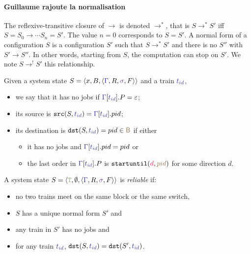\documentclass[runningheads]{llncs}
\newcommand{\tuple}[1]{\ensuremath{\langle #1\rangle}}
\newcommand{\dirFmt}[1]{{\color{dircolor} #1}}
\newcommand{\posFmt}[1]{{\color{poscolor}{#1}}}
\newcommand{\blocks}{{\posFmt{\mathsf{B}}}}
\newcommand{\swFmt}[1]{{\color{swcolor}{#1}}}
\newcommand{\switches}{\ensuremath{\swFmt{\sigma}}}
\newcommand{\trainFmt}[1]{{\color{traincolor} #1}}
\newcommand{\trainSeq}{\trainFmt{\Gamma\xspace}}
\newcommand{\tid}[1]{\ensuremath{\trainFmt{t_{#1}}}}
\newcommand{\su}[2]{{\mbox{$\mathtt{startuntil}(\dirFmt{#1}, \posFmt{#2})$}}\xspace}
\newcommand{\emptyTrainProg}{\varepsilon}
\newcommand{\regulator}{\ensuremath{R}}
\newcommand{\signals}{\ensuremath{F}}
\newcommand{\stateTuple}[4]{\tuple{#1, #2, #3, #4}}
\newcommand{\guardFmt}[1]{{\color{guardcolor} \ensuremath{\mathtt{#1}}}}
\newcommand{\guardT}{\guardFmt{T}}
\newcommand{\reduces}{\ensuremath{\rightarrow}}
\newcommand{\redTuple}[3]{\ensuremath{\tuple{#1, #2, #3}}}
\begin{document}
\paragraph{Guillaume rajoute la normalisation}

The reflexive-transitive closure of $\reduces$ is denoted $\reduces^*$, that is $S \reduces^* S'$ iff $S =S_0 \reduces \cdots S_n = S'$. The value $n = 0$ corresponds to $S = S'$.  A normal form of a configuration $S$ is a configuration $S'$ such that $S \reduces^* S'$ and there is no $S''$ with $S' \reduces S''$. In other words, starting from $S$, the computation can stop on $S'$. We note $S \reduces^! S'$ this relationship.

Given a system state  $S = \redTuple{x}{B}{\stateTuple{\trainSeq{}}{\regulator}{\switches}{\signals}}$ and a train $\tid{id}$, 
\begin{itemize}
	\item   we say that it has no jobs if  $\trainSeq{}[\tid{id}].P = \emptyTrainProg$;
	\item its source is $\mathtt{src}(S, \tid{id}) = \trainSeq{}[\tid{id}].pid$;
	\item its destination is $\mathtt{dst}(S, \tid{id}) = pid \in \blocks $ if either
	\begin{itemize}
		\item  it has no jobs and  $\trainSeq{}[\tid{id}].pid = pid$  or
		\item  the last order in  $\trainSeq{}[\tid{id}].P$ is $\su{d}{pid}$ for some direction $d$.
	\end{itemize}
\end{itemize}

A system state $S = \redTuple{\guardT}{\emptyset}{\stateTuple{\trainSeq{}}{\regulator}{\switches}{\signals}} $  is \emph{reliable} if: 
\begin{itemize}
	\item  no two trains meet on the same block or the same switch, 
	\item $S$ has  a unique normal form $S'$ and 
	\item any train in $S'$ has no jobs and 
	\item for any train $\tid{id}$, $\mathtt{dst}(S, \tid{id}) =  \mathtt{dst}(S', \tid{id})$. 
\end{itemize}
\end{document}
